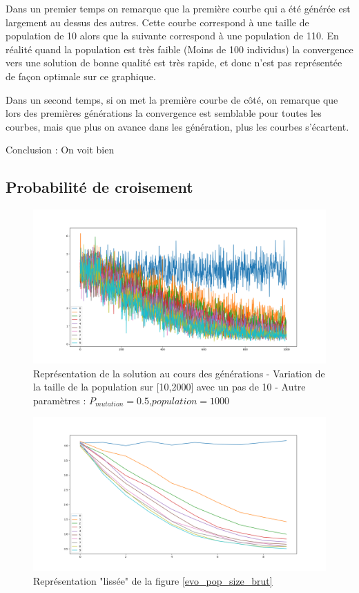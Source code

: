 \documentclass[12pt]{report}
\begin{document}
        Dans un premier temps on remarque que la première courbe qui a été générée est largement au dessus des autres. Cette courbe correspond à une taille de population de 10 alors que la suivante correspond à une population de 110. En réalité quand la population est très faible (Moins de 100 individus) la convergence vers une solution de bonne qualité est très rapide, et donc n'est pas représentée de façon optimale sur ce graphique.

        Dans un second temps, si on met la première courbe de côté, on remarque que lors des premières générations la convergence est semblable pour toutes les courbes, mais que plus on avance dans les génération, plus les courbes s'écartent.

        Conclusion : On voit bien



      \subsection{Probabilité de croisement}

      \begin{figure}[h]
        \centering
        \includegraphics[width=15cm]{img/evo_crossover_brut.png}
        \caption{Représentation de la solution au cours des générations - Variation de la taille de la population sur [10,2000] avec un pas de 10 - Autre paramètres : $P_{mutation} = 0.5$,$population = 1000$}
        \label{evo_crossover_brut}
      \end{figure}

      \begin{figure}[h]
        \centering
        \includegraphics[width=15cm]{img/evo_crossover_moy.png}
        \caption{Représentation "lissée" de la figure \ref{evo_pop_size_brut}}
        \label{evo_crossover_moy}
      \end{figure}
\end{document}
